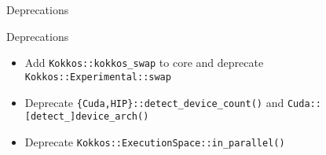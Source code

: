 

\begin{frame}[fragile]

  {\Huge Deprecations}
  
    \vspace{10pt}

\end{frame}



\begin{frame}[fragile]{Deprecations}


\begin{itemize}
\item Add \texttt{Kokkos::kokkos\_swap} to core and deprecate \texttt{Kokkos::Experimental::swap}
\item Deprecate \texttt{\{Cuda,HIP\}::detect\_device\_count()} and \texttt{Cuda::[detect\_]device\_arch()}
\item Deprecate \texttt{Kokkos::ExecutionSpace::in\_parallel()}
\end{itemize}


\end{frame}

